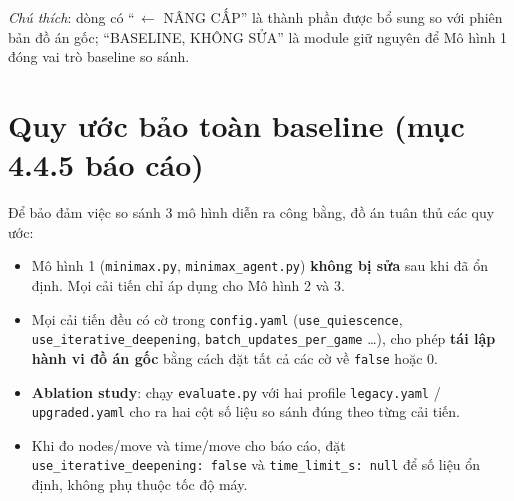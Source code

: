 \documentclass[11pt,a4paper]{article}
\begin{document}
\textit{Chú thích}: dòng có ``\,$\leftarrow$ NÂNG CẤP'' là thành phần được bổ sung so với
phiên bản đồ án gốc; ``BASELINE, KHÔNG SỬA'' là module giữ nguyên để Mô hình 1 đóng
vai trò baseline so sánh.

\section{Quy ước bảo toàn baseline (mục 4.4.5 báo cáo)}

Để bảo đảm việc so sánh 3 mô hình diễn ra công bằng, đồ án tuân thủ các quy ước:

\begin{itemize}
  \item Mô hình 1 (\texttt{minimax.py}, \texttt{minimax\_agent.py}) \textbf{không bị sửa}
    sau khi đã ổn định. Mọi cải tiến chỉ áp dụng cho Mô hình 2 và 3.
  \item Mọi cải tiến đều có cờ trong \texttt{config.yaml}
    (\texttt{use\_quiescence}, \texttt{use\_iterative\_deepening},
    \texttt{batch\_updates\_per\_game} \dots), cho phép \textbf{tái lập hành vi đồ án
    gốc} bằng cách đặt tất cả các cờ về \texttt{false} hoặc 0.
  \item \textbf{Ablation study}: chạy \texttt{evaluate.py} với hai profile
    \texttt{legacy.yaml} / \texttt{upgraded.yaml} cho ra hai cột số liệu so sánh
    đúng theo từng cải tiến.
  \item Khi đo nodes/move và time/move cho báo cáo, đặt
    \texttt{use\_iterative\_deepening: false} và \texttt{time\_limit\_s: null}
    để số liệu ổn định, không phụ thuộc tốc độ máy.
\end{itemize}
\end{document}
